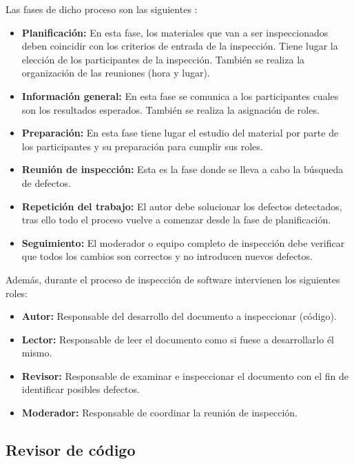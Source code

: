 Las fases de dicho proceso son las siguientes \cite{Fagan:1986:ASI:10677.2412491}:

\begin{itemize}
\tightlist
	\item \textbf{Planificación:} En esta fase, los materiales que van a ser inspeccionados deben coincidir con los criterios de entrada de la inspección. Tiene lugar la elección de los participantes de la inspección. También se realiza la organización de las reuniones (hora y lugar).
	\item \textbf{Información general:} En esta fase se comunica a los participantes cuales son los resultados esperados. También se realiza la asignación de roles.
	\item \textbf{Preparación:} En esta fase tiene lugar el estudio del material por parte de los participantes y su preparación para cumplir sus roles.
	\item \textbf{Reunión de inspección:} Esta es la fase donde se lleva a cabo la búsqueda de defectos.
	\item \textbf{Repetición del trabajo:} El autor debe solucionar los defectos detectados, tras ello todo el proceso vuelve a comenzar desde la fase de planificación.
	\item \textbf{Seguimiento:} El moderador o equipo completo de inspección debe verificar que todos los cambios son correctos y no introducen nuevos defectos.
\end{itemize}


Además, durante el proceso de inspección de software intervienen los siguientes roles:

\begin{itemize}
\tightlist
	\item \textbf{Autor:} Responsable del desarrollo del documento a inspeccionar (código).
	\item \textbf{Lector:} Responsable de leer el documento como si fuese a desarrollarlo él mismo.
	\item \textbf{Revisor:} Responsable de examinar e inspeccionar el documento con el fin de identificar posibles defectos.
	\item \textbf{Moderador:} Responsable de coordinar la reunión de inspección.
\end{itemize}

\subsection{Revisor de código}

